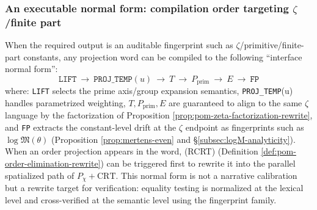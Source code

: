 \subsubsection{An executable normal form: compilation order targeting \texorpdfstring{$\zeta$}{zeta}/finite part}
\begin{remark}\label{rem:pom-zeta-normal-form}
When the required output is an auditable fingerprint such as \(\zeta\)/primitive/finite-part constants, any projection word can be compiled to the following ``interface normal form'':
$$
\boxed{\;
\texttt{LIFT}\ \to\ \texttt{PROJ\_TEMP}(u)\ \to\ T\ \to\ P_{\mathrm{prim}}\ \to\ E\ \to\ \texttt{FP}\;}
$$
where:
\texttt{LIFT} selects the prime axis/group expansion semantics,
\texttt{PROJ\_TEMP}(u) handles parametrized weighting,
\(T,P_{\mathrm{prim}},E\) are guaranteed to align to the same \(\zeta\) language by the factorization of Proposition \ref{prop:pom-zeta-factorization-rewrite},
and \texttt{FP} extracts the constant-level drift at the \(\zeta\) endpoint as fingerprints such as \(\log\mathfrak{M}(\theta)\) (Proposition \ref{prop:mertens-even} and \S\ref{subsec:logM-analyticity}).
When an order projection appears in the word, (RCRT) (Definition \ref{def:pom-order-elimination-rewrite}) can be triggered first to rewrite it into the parallel spatialized path of \(P_\chi+\mathrm{CRT}\).
This normal form is not a narrative calibration but a rewrite target for verification: equality testing is normalized at the lexical level and cross-verified at the semantic level using the fingerprint family.
\end{remark}

